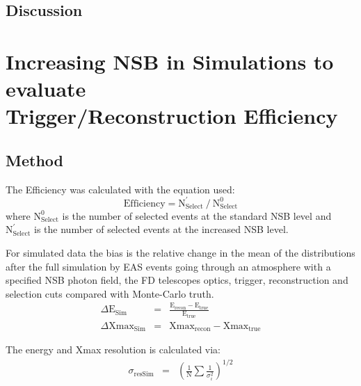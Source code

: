 \subsection{Discussion}

\section{Increasing NSB in Simulations to evaluate \\ Trigger/Reconstruction Efficiency}

\subsection{Method}
 The Efficiency was calculated with the equation used:
\begin{equation}
\mathrm{Efficiency} = \mathrm{N}^{'}_{\mathrm{Select}} \ / \ \mathrm{N}^0_{\mathrm{Select}}
\end{equation}
where $\mathrm{N}^{0}_{\mathrm{Select}}$ is the number of selected events at the standard NSB level and $\mathrm{N}^{'}_{\mathrm{Select}}$ is the number of selected events at the increased NSB
level. 

For simulated data the bias is the relative change in the mean of the distributions after the full simulation by EAS events going through an atmosphere with a specified NSB photon field, the FD telescopes optics, trigger, reconstruction and selection cuts compared with Monte-Carlo truth.
\begin{eqnarray}
\Delta \mathrm{E}_{\mathrm{Sim}} &=& \frac{\mathrm{E}_{\mathrm{recon}} - \mathrm{E}_{\mathrm{true}}}{\mathrm{E}_{\mathrm{true}}}  \label{eq:energybias_sim} \\
\Delta \mathrm{Xmax}_{\mathrm{Sim}} &=& \mathrm{Xmax}_{\mathrm{recon}} - \mathrm{Xmax}_{\mathrm{true}} \label{eq:xmaxbias_sim}
\end{eqnarray}
 
 
The energy and Xmax resolution is calculated via:
\begin{eqnarray}
\sigma_{\mathrm{resSim}} &=& \left( \frac{1}{\mathrm{N}} \sum \frac{1}{\sigma^2_i} \right)^{1/2}
\end{eqnarray}

